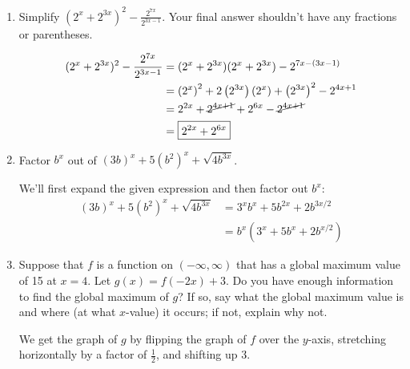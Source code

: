 \documentclass{article}
\theoremstyle{theorem}
\begin{document}
\begin{enumerate}
\begin{enumerate}
  \item
    \begin{problem}[\vfill\newpage]
      Simplify $(2^x + 2^{3x})^2 - \displaystyle \frac{2^{7x}}{2^{3x-1}}$. Your final answer shouldn't have any fractions or parentheses.
    \end{problem}

    \begin{solution}
      \begin{align*}
        (2^x + 2^{3x})^2 - \frac{2^{7x}}{2^{3x-1}} &= (2^x + 2^{3x}) (2^x + 2^{3x}) - 2^{7x - (3x - 1)} \\
        &= \left( 2^x \right)^2 + 2 \left( 2^{3x} \right) \left( 2^x \right) + \left( 2^{3x} \right)^2 - 2^{4x + 1} \\
        &= 2^{2x} + \cancel{2^{4x + 1}} + 2^{6x} - \cancel{2^{4x + 1}} \\
        &= \boxed{2^{2x} + 2^{6x}}
      \end{align*}
    \end{solution}

  \item
    \begin{problem}[\vfill]
      Factor $b^x$ out of $(3b)^x + 5 (b^2)^x + \sqrt{4 b^{3x}}$.
    \end{problem}

    \begin{solution}
      We'll first expand the given expression and then factor out $b^x$:
      \begin{align*}
        (3b)^x + 5 (b^2)^x + \sqrt{4 b^{3x}} &= 3^x b^x + 5 b^{2x} + 2
        b^{3x/2} \\
        &= \boxed{b^x \left( 3^x + 5 b^x + 2 b^{x/2} \right)}
      \end{align*}
    \end{solution}    

  \item %

    \begin{problem}[\vfill\newpage]
      Suppose that $f$ is a function on $(-\infty, \infty)$ that has a global maximum value of 15 at $x = 4$. Let $g(x) = f(-2x) + 3$. Do you have enough information to find the global maximum of $g$? If so, say what the global maximum value is and where (at what $x$-value) it occurs; if not, explain why not. 
    \end{problem}

    \begin{solution}
      We get the graph of $g$ by flipping the graph of $f$ over the $y$-axis, stretching horizontally by a factor of $\frac{1}{2}$, and shifting up 3.


\end{solution}
\end{enumerate}
\end{enumerate}
\end{document}
